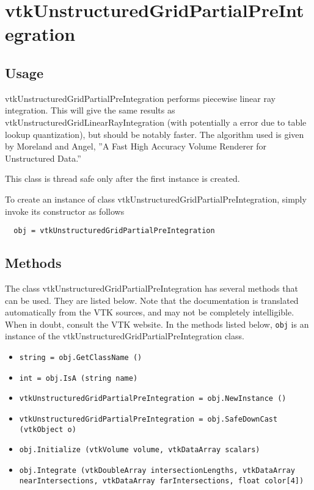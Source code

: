 \section{vtkUnstructuredGridPartialPreIntegration}

\subsection{Usage}


 vtkUnstructuredGridPartialPreIntegration performs piecewise linear ray
 integration.  This will give the same results as
 vtkUnstructuredGridLinearRayIntegration (with potentially a error due to
 table lookup quantization), but should be notably faster.  The algorithm
 used is given by Moreland and Angel, ''A Fast High Accuracy Volume
 Renderer for Unstructured Data.''

 This class is thread safe only after the first instance is created.


To create an instance of class vtkUnstructuredGridPartialPreIntegration, simply
invoke its constructor as follows
\begin{verbatim}
  obj = vtkUnstructuredGridPartialPreIntegration
\end{verbatim}
\subsection{Methods}

The class vtkUnstructuredGridPartialPreIntegration has several methods that can be used.
  They are listed below.
Note that the documentation is translated automatically from the VTK sources,
and may not be completely intelligible.  When in doubt, consult the VTK website.
In the methods listed below, \verb|obj| is an instance of the vtkUnstructuredGridPartialPreIntegration class.
\begin{itemize}
\item  \verb|string = obj.GetClassName ()|

\item  \verb|int = obj.IsA (string name)|

\item  \verb|vtkUnstructuredGridPartialPreIntegration = obj.NewInstance ()|

\item  \verb|vtkUnstructuredGridPartialPreIntegration = obj.SafeDownCast (vtkObject o)|

\item  \verb|obj.Initialize (vtkVolume volume, vtkDataArray scalars)|

\item  \verb|obj.Integrate (vtkDoubleArray intersectionLengths, vtkDataArray nearIntersections, vtkDataArray farIntersections, float color[4])|

\end{itemize}
